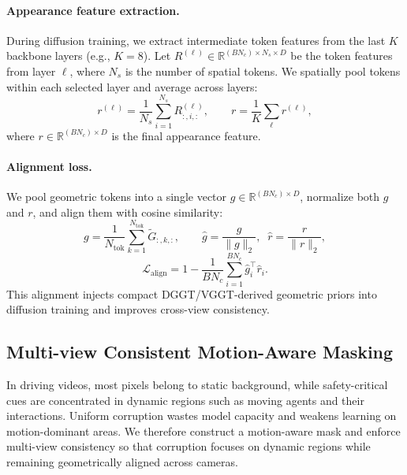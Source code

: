 \documentclass{article}
\begin{document}
\paragraph{Appearance feature extraction.}
During diffusion training, we extract intermediate token features from the last $K$ backbone layers
(e.g., $K{=}8$). Let $R^{(\ell)} \in \mathbb{R}^{(B N_c)\times N_s \times D}$ be the token features from layer $\ell$,
where $N_s$ is the number of spatial tokens.
We spatially pool tokens within each selected layer and average across layers:
\begin{equation}
r^{(\ell)} = \frac{1}{N_s}\sum_{i=1}^{N_s} R^{(\ell)}_{:,i,:},
\qquad
r = \frac{1}{K}\sum_{\ell} r^{(\ell)},
\label{eq:app_feat}
\end{equation}
where $r \in \mathbb{R}^{(B N_c)\times D}$ is the final appearance feature.

\paragraph{Alignment loss.}
We pool geometric tokens into a single vector $g \in \mathbb{R}^{(B N_c)\times D}$,
normalize both $g$ and $r$, and align them with cosine similarity:
\begin{equation}
g = \frac{1}{N_{\mathrm{tok}}}\sum_{k=1}^{N_{\mathrm{tok}}} \tilde{G}_{:,k,:},
\qquad
\hat{g}=\frac{g}{\lVert g\rVert_2},\;\;
\hat{r}=\frac{r}{\lVert r\rVert_2},
\label{eq:geo_pool_norm}
\end{equation}
\begin{equation}
\mathcal{L}_{\mathrm{align}}
= 1 - \frac{1}{B N_c}\sum_{i=1}^{B N_c} \hat{g}_i^{\top}\hat{r}_i.
\label{eq:align_loss}
\end{equation}
This alignment injects compact DGGT/VGGT-derived geometric priors into diffusion training and improves cross-view consistency.


\subsection{Multi-view Consistent Motion-Aware Masking}
\label{subsec:motion_mask}

In driving videos, most pixels belong to static background, while safety-critical cues are concentrated in dynamic regions such as moving agents and their interactions. Uniform corruption wastes model capacity and weakens learning on motion-dominant areas. We therefore construct a motion-aware mask and enforce multi-view consistency so that corruption focuses on dynamic regions while remaining geometrically aligned across cameras.
\end{document}
